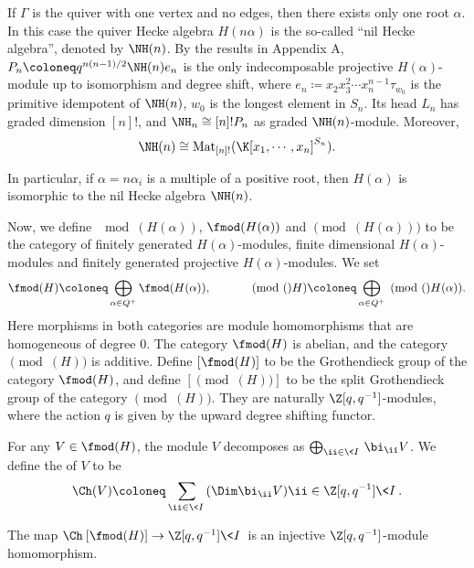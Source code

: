 \begin{example}
    If $\Gamma$ is the quiver with one vertex and no edges,
    then there exists only one root $\alpha$.
    In this case the quiver Hecke algebra $H(n\alpha)$
    is the so-called ``nil Hecke algebra'', denoted by $\NH(n)$.
    By the results in Appendix A, $P_n \coloneq  q^{n(n-1)/2}\NH(n)e_n$ is the only
    indecomposable projective $H(\alpha)$-module up to isomorphism and degree shift,
    where $e_n \coloneq  x_2x_3^2\cdots x_n^{n-1}\tau_{w_0}$ 
    is the primitive idempotent of $\NH(n)$, $w_0$ is the longest element in $S_n$. Its head $L_n$
    has graded dimension $[n]!$, and $\NH_n\cong[n]!P_n$ as
    graded $\NH(n)$-module. Moreover, 
    \[
        \NH(n)\cong\operatorname{Mat}
        _{[n]!}(\K[x_1,\cdots,x_n]^{S_n}).
    \]   
\end{example}

In particular, if $\alpha = n\alpha_i$ is a multiple of a positive root,
then $H(\alpha)$ is isomorphic to the nil Hecke algebra $\NH(n)$.

Now, we define $\mod(H(\alpha))$, $\fmod(H(\alpha))$ and $\pmod(H(\alpha))$ to be the category
of finitely generated $H(\alpha)$-modules, finite dimensional $H(\alpha)$-modules and finitely generated
projective $H(\alpha)$-modules. We set 
\[
    \fmod(H) \coloneq  \bigoplus_{\alpha\in Q^+}
    \fmod(H(\alpha)),\hspace{3em}\pmod(H) \coloneq   \bigoplus_{\alpha\in Q^+}
    \pmod(H(\alpha)).
\]
Here morphisms in both categories are module homomorphisms
that are homogeneous of degree $0$. The category $\fmod(H)$ is abelian,
and the category $\pmod(H)$ is additive. Define $[\fmod(H)]$
to be the Grothendieck group of the category $\fmod(H)$, and define
$[\pmod(H)]$ to be the split Grothendieck group of the category $\pmod(H)$. They are
naturally $\Z[q,q^{-1}]$-modules, where the action $q$ is given by the
upward degree shifting functor.

For any $V\in\fmod(H)$, the module $V$ decomposes
as $\bigoplus_{\ii\in\<I\>}\bi_{\ii}V$. We define the  of
$V$ to be 
\[
    \Ch(V) \coloneq   \sum_{\ii\in\<I\>} (\Dim\bi_{\ii}V)\ii\in\Z[q,q^{-1}]\<I\>.
\]

\begin{proposition}[{\cite[Theorem 3.17]{KL1}}]
    The map $\Ch\:[\fmod(H)]\to\Z[q,q^{-1}]\<I\>$ is an injective
    $\Z[q,q^{-1}]$-module homomorphism.
\end{proposition}

